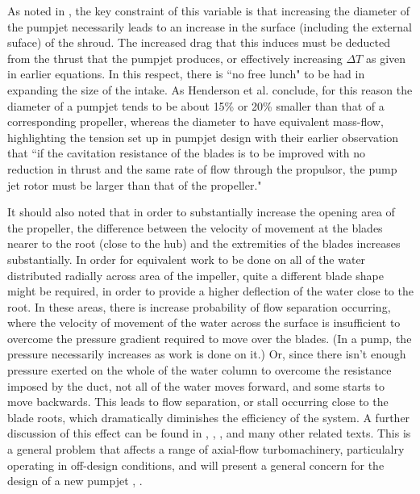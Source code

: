 \documentclass{article}\usepackage[]{graphicx}\usepackage[]{color}
\begin{document}
As noted in \cite{henderson1964}, the key constraint of this variable is that increasing the diameter of the pumpjet necessarily leads to an increase in the surface (including the external suface) of the shroud.  The increased drag that this induces must be deducted from the thrust that the pumpjet produces, or effectively increasing $\Delta T$ as given in earlier equations.  In this respect, there is ``no free lunch" to be had in expanding the size of the intake.  As Henderson et al. conclude, for this reason the diameter of a pumpjet tends to be about 15\% or 20\% smaller than that of a corresponding propeller, whereas the diameter to have equivalent mass-flow, highlighting the tension set up in pumpjet design with their earlier observation that ``if the cavitation resistance of the blades is to be improved with no reduction in thrust and the same rate of flow through the propulsor, the pump jet rotor must be larger than that of the propeller." \parencite[1]{henderson1964}

It should also noted that in order to substantially increase the opening area of the propeller, the difference between the velocity of movement at the blades nearer to the root (close to the hub) and the extremities of the blades increases substantially.  In order for equivalent work to be done on all of the water distributed radially across area of the impeller, quite a different blade shape might be required, in order to provide a higher deflection of the water close to the root. In these areas, there is increase probability of flow separation occurring, where the velocity of movement of the water across the surface is insufficient to overcome the pressure gradient required to move over the blades.  (In a pump, the pressure necessarily increases as work is done on it.)  Or, since there isn't enough pressure exerted on the whole of the water column to overcome the resistance imposed by the duct, not all of the water moves forward, and some starts to move backwards.  This leads to flow separation, or stall occurring close to the blade roots, which dramatically diminishes the efficiency of the system. A further discussion of this effect can be found in \cite[15,27]{henderson1964},  \cite[807,8012]{bruce1974},  \cite[185]{wislicenus1973}, \cite[60]{mcbride1979} and many other related texts.  This is a general problem that affects a range of axial-flow turbomachinery, particulalry operating in off-design conditions, and will present a general concern for the design of a new pumpjet \cite[185]{wislicenus1986}, \cite{li2013}.
\end{document}
